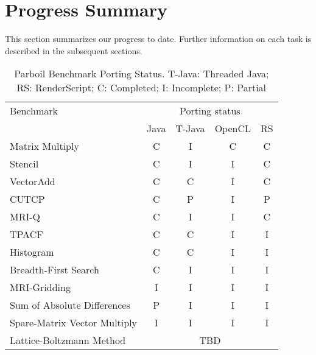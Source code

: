 \section*{Progress Summary}

This section summarizes our progress to date. Further information on each task
is described in the subsequent sections.


\begin{table}[h]\small
\centering
\begin{tabular}{ | l | c | c | c | c |}
    \hline 
    Benchmark & \multicolumn{4}{|c|}{Porting status} \\ \cline{2-5}
              & Java & T-Java & OpenCL & RS \\ \hline
    Matrix Multiply & C & I & C & C \\ \hline
    Stencil & C & I & I & C \\ \hline
    VectorAdd & C & C & I & C \\ \hline
    CUTCP & C & P  & I  & P \\ \hline
    MRI-Q & C & I & I & C \\ \hline
    TPACF & C & C & I & I \\ \hline
    Histogram & C & C & I & I \\ \hline
    Breadth-First Search & C & I & I & I \\ \hline
    MRI-Gridding & I & I & I & I \\ \hline
    Sum of Absolute Differences & P & I & I & I \\ \hline
    Spare-Matrix Vector Multiply & I & I & I & I \\ \hline
    Lattice-Boltzmann Method & \multicolumn{4}{|c|}{TBD} \\ \hline
    \hline
\end{tabular}
\caption{Parboil Benchmark Porting Status. T-Java: Threaded Java; RS:
RenderScript; C: Completed; I: Incomplete; P: Partial}
\label{table:parboil}
\end{table}

